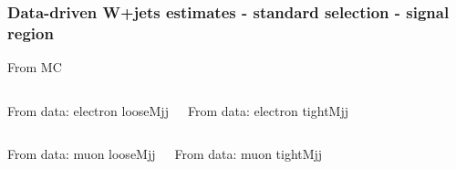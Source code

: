 \documentclass[red,compress,xcolor=table]{beamer}
\begin{document}
\begin{frame}
  \frametitle{Data-driven W+jets estimates - standard selection - signal region}

\vspace*{-0.5cm}
\begin{block}{\scriptsize From MC}
\begin{center}
    {\tiny
      
    }
\end{center}
  \end{block}

\vspace*{-0.2cm}
\begin{columns}
  \begin{block}{\scriptsize From data: electron looseMjj}
    {\tiny
      
    }
  \end{block}
  \begin{block}{\scriptsize From data: electron tightMjj}
    {\tiny
      
    }
  \end{block}
\end{columns}
\begin{columns}
  \begin{block}{\scriptsize From data: muon looseMjj}
    {\tiny
      
    }
  \end{block}
  \begin{block}{\scriptsize From data: muon tightMjj}
    {\tiny
      
    }
  \end{block}
\end{columns}


\end{frame}
\end{document}
